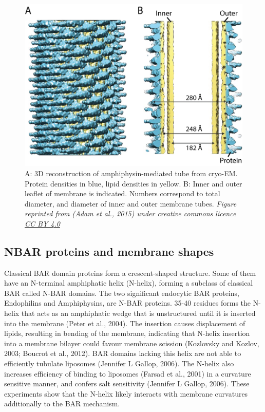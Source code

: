 		
\begin{figure}[H]
	\centering
\includegraphics[scale=0.4]{figures/intro/BAR_scaffold}
\caption[BAR domain scaffolds]
{A: 3D reconstruction of amphiphysin-mediated tube from cryo-EM. Protein densities in blue,  lipid densities in yellow. B: Inner and outer leaflet of membrane is indicated. Numbers correspond to total diameter, and diameter of inner and outer membrane tubes. \textit{Figure reprinted from (Adam et al., 2015) under creative commons licence \href{https://creativecommons.org/licenses/by/4.0/}{CC BY 4.0}}
\label{intro_barscaffold}}
	\end{figure}



	\subsection{NBAR proteins and membrane shapes}	
Classical BAR domain proteins form a crescent-shaped structure. Some of them have an N-terminal amphiphatic helix (N-helix), forming a subclass of classical BAR called N-BAR domains. The two significant endocytic BAR proteins, Endophilins and Amphiphysins, are N-BAR proteins. 35-40 residues forms the N-helix that acts as an amphiphatic wedge that is unstructured until it is inserted into the membrane (Peter et al., 2004). The insertion causes displacement of lipids, resulting in bending of the membrane, indicating that N-helix insertion into a membrane bilayer could favour membrane scission (Kozlovsky and Kozlov, 2003; Boucrot et al., 2012). BAR domains lacking this helix are not able to efficiently tubulate  liposomes (Jennifer L Gallop, 2006). The N-helix also increases efficiency of binding to liposomes (Farsad et al., 2001) in a curvature sensitive manner, and confers salt sensitivity (Jennifer L Gallop, 2006). These experiments show that the N-helix likely interacts with membrane curvatures additionally to the BAR mechanism. 


